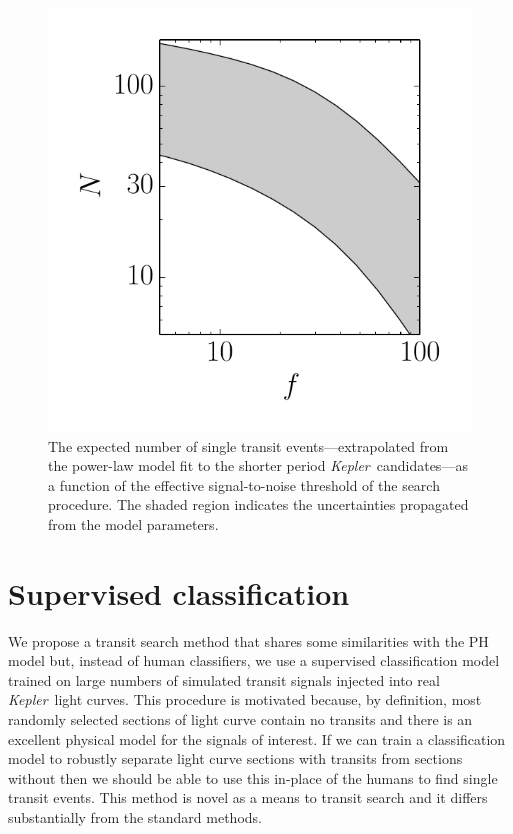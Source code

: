 \documentclass[12pt,preprint]{aastex}
\newcommand{\project}[1]{\textsl{#1}}
\newcommand{\kepler}{\project{Kepler}}
\newcommand{\figlabel}[1]{\label{fig:#1}}
\begin{document}
\begin{figure}[p]
\begin{center}
\includegraphics{figures/predict.pdf}
\end{center}
\caption{%
The expected number of single transit events---extrapolated from the
\citet{Dong:2013} power-law model fit to the shorter period \kepler\
candidates---as a function of the effective signal-to-noise threshold of the
search procedure.
The shaded region indicates the uncertainties propagated from the model
parameters.
\figlabel{predict}}
\end{figure}


\section{Supervised classification}

We propose a transit search method that shares some similarities with the PH
model but, instead of human classifiers, we use a supervised classification
model trained on large numbers of simulated transit signals injected into
real \kepler\ light curves.
This procedure is motivated because, by definition, most randomly selected
sections of light curve contain no transits and there is an excellent physical
model for the signals of interest.
If we can train a classification model to robustly separate light curve
sections with transits from sections without then we should be able to use
this in-place of the humans to find single transit events.
This method is novel as a means to transit search and it differs substantially
from the standard methods.
\end{document}
